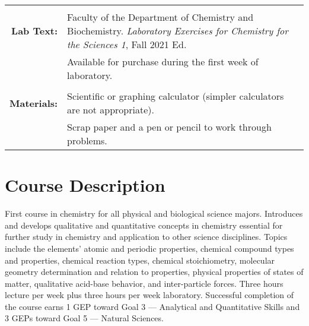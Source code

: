 \documentclass[11pt,letterpaper]{article}
\begin{document}
\begin{tabularx}{\linewidth} {@{\qquad}>{\bfseries\sffamily}r
	>{\raggedright\arraybackslash}X@{\qquad}}
	      \\ \\
	Lab Text: & Faculty of the Department of Chemistry and
	Biochemistry. \textit{Laboratory Exercises for Chemistry for
			      the Sciences 1}, Fall 2021 Ed. \\
	       	      & \footnotesize Available for purchase during the first
		      week of laboratory. \\ \\
	Materials: & Scientific or graphing calculator (simpler calculators
	are not appropriate). \\
		   & Scrap paper and a pen or pencil to work through problems.
		   \\
	\bottomrule
\end{tabularx}

\section{Course Description}
First course in chemistry for all physical and biological science majors.
Introduces and develops qualitative and quantitative concepts in chemistry
essential for further study in chemistry and application to other science
disciplines. Topics include the elements' atomic and periodic properties,
chemical compound types and properties, chemical reaction types, chemical
stoichiometry, molecular geometry determination and relation to properties,
physical properties of states of matter, qualitative acid-base behavior, and
inter-particle forces. Three hours lecture per week plus three hours per week
laboratory. Successful completion of the course earns 1 GEP toward Goal 3 ---
Analytical and Quantitative Skills and 3 GEPs toward Goal 5 --- Natural
Sciences.
\end{document}
